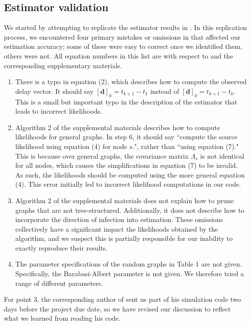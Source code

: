 \subsection{Estimator validation}
We started by attempting to replicate the estimator results in \cite{pinto}. 
In this replication process, we encountered four primary mistakes or omissions in \cite{pinto} that affected our estimation accuracy; some of these were easy to correct once we identified them, others were not. All equation numbers in this list are with respect to \cite{pinto} and the corresponding supplementary materials.
\begin{enumerate}
\item There is a typo in equation (2), which describes how to compute the observed delay vector. It should say $[\boldsymbol d]_k=t_{k+1}-t_1$ instead of $[\boldsymbol d]_k=t_{k+1}-t_k$. This is a small but important typo in the description of the estimator that leads to incorrect likelihoods. 
\item Algorithm 2 of the supplemental materials describes how to compute likelihoods for general graphs. In step 6, it should say ``compute the source likelihood using equation (4) for node $s$.", rather than ``using equation (7)." This is because over general graphs, the covariance matrix $\Lambda_s$ is not identical for all nodes, which causes the simplifications in equation (7) to be invalid. As such, the likelihoods should be computed using the more general equation (4). This error initially led to incorrect likelihood computations in our code.
\item Algorithm 2 of the supplemental materials does not explain how to prune graphs that are not tree-structured. Additionally, it does not describe how to incorporate the direction of infection into estimation. These omissions collectively have a significant impact the likelihoods obtained by the algorithm, and we suspect this is partially responsible for our inability to exactly reproduce their results.
\item The parameter specifications of the random graphs in Table 1 are not given. Specifically, the Barabasi-Albert parameter is not given. We therefore tried a range of different parameters.
\end{enumerate}
For point 3, the corresponding author of \cite{pinto} sent us part of his simulation code two days before the project due date, so we have revised our discussion to reflect what we learned from reading his code. 

